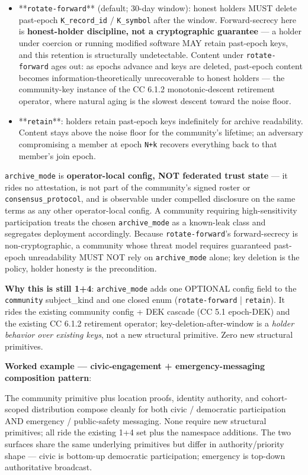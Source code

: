\documentclass[11pt]{article}
\begin{document}
\begin{itemize}\setlength\itemsep{0pt}
\item **\texttt{rotate-forward}** (default; 30-day window): honest holders MUST delete past-epoch \texttt{K\_record\_id} / \texttt{K\_symbol} after the window. Forward-secrecy here is \textbf{honest-holder discipline, not a cryptographic guarantee} — a holder under coercion or running modified software MAY retain past-epoch keys, and this retention is structurally undetectable. Content under \texttt{rotate-forward} ages out: as epochs advance and keys are deleted, past-epoch content becomes information-theoretically unrecoverable to honest holders — the community-key instance of the CC 6.1.2 monotonic-descent retirement operator, where natural aging is the slowest descent toward the noise floor.
\item **\texttt{retain}**: holders retain past-epoch keys indefinitely for archive readability. Content stays above the noise floor for the community's lifetime; an adversary compromising a member at epoch \texttt{N+k} recovers everything back to that member's join epoch.
\end{itemize}


\texttt{archive\_mode} is \textbf{operator-local config, NOT federated trust state} — it rides no attestation, is not part of the community's signed roster or \texttt{consensus\_protocol}, and is observable under compelled disclosure on the same terms as any other operator-local config. A community requiring high-sensitivity participation treats the chosen \texttt{archive\_mode} as a known-leak class and segregates deployment accordingly. Because \texttt{rotate-forward}'s forward-secrecy is non-cryptographic, a community whose threat model requires guaranteed past-epoch unreadability MUST NOT rely on \texttt{archive\_mode} alone; key deletion is the policy, holder honesty is the precondition.


\textbf{Why this is still 1+4}: \texttt{archive\_mode} adds one OPTIONAL config field to the \texttt{community} subject\_kind and one closed enum (\texttt{rotate-forward} | \texttt{retain}). It rides the existing community config + DEK cascade (CC 5.1 epoch-DEK) and the existing CC 6.1.2 retirement operator; key-deletion-after-window is a \textit{holder behavior over existing keys}, not a new structural primitive. Zero new structural primitives.


\textbf{Worked example — civic-engagement + emergency-messaging composition pattern}:


The community primitive plus location proofs, identity authority, and cohort-scoped distribution compose cleanly for both civic / democratic participation AND emergency / public-safety messaging. None require new structural primitives; all ride the existing 1+4 set plus the namespace additions. The two surfaces share the same underlying primitives but differ in authority/priority shape — civic is bottom-up democratic participation; emergency is top-down authoritative broadcast.
\end{document}
